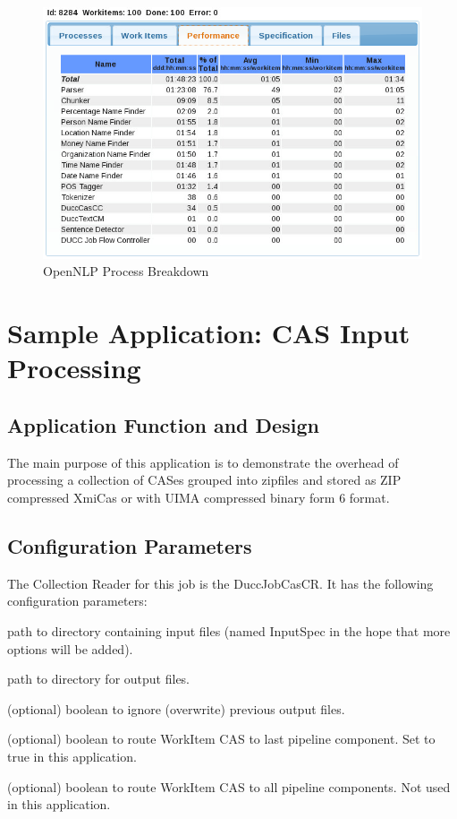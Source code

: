 \begin{figure}[H]
  \centering
  \includegraphics[bb=0 0 708 469, width=5.5in]{images/BooksRawPerf.png}
  \caption{OpenNLP Process Breakdown}
  \label{fig:OpenNLP-Process-Breakdown}
\end{figure}


\chapter{Sample Application: CAS Input Processing}

\section{Application Function and Design}
The main purpose of this application is to demonstrate the overhead of processing a collection of CASes grouped into 
zipfiles and stored as ZIP compressed XmiCas or with UIMA compressed binary form 6 format.


\section{Configuration Parameters}
The Collection Reader for this job is the DuccJobCasCR. It has the following configuration
parameters:

\begin{description}[labelindent=0.5in,leftmargin=0.5in]
    \item[InputSpec] path to directory containing input files (named InputSpec in the hope that more options will be added).
    \item[OutputDirectory] path to directory for output files.
    \item[IgnorePreviousOutput] (optional) boolean to ignore (overwrite) previous output files.
    \item[SendToLast] (optional) boolean to route WorkItem CAS to last pipeline component. Set to true in this application.
    \item[SendToAll] (optional) boolean to route WorkItem CAS to all pipeline components. Not used in this application.
\end{description}


